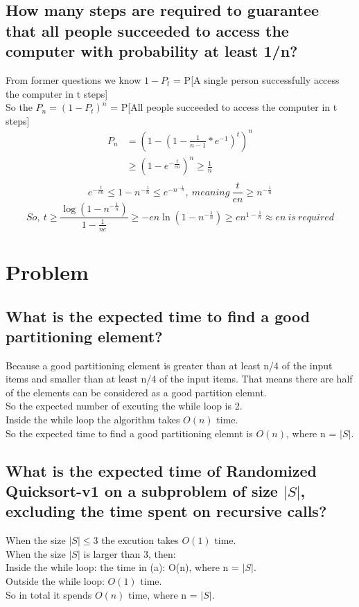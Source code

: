 \documentclass{article}
\begin{document}
\clearpage
\subsection{How many steps are required to guarantee that all people succeeded to access the computer with probability at least 1/n?}
From former questions we know $1-P_t$ = P[A single person successfully access the computer in t steps]\\
So the $P_n = (1-P_t)^n$ = P[All people succeeded to access the computer in t steps]\\
\begin{equation}
\begin{aligned}
P_n &=(1-(1-\frac{1}{n-1}*e^{-1})^t)^{n}\\
&\ge (1-e^{-{\frac{t}{en}}})^{n} \ge \frac{1}{n}\\
\end{aligned}
\end{equation}
$$e^{-{\frac{t}{en}}}\le 1-n^{-\frac{1}{n}}\le e^{-n^{-\frac{1}{n}}},\ meaning\ \frac{t}{en} \ge n^{-\frac{1}{n}}$$
$$So,\ t\ge \frac{\log(1-n^{-\frac{1}{n}})}{1-\frac{1}{ne}} \ge -en\ln(1-n^{-\frac{1}{n}}) \ge en^{1-\frac{1}{n}}\approx en \ is\ required$$

\clearpage
\section{Problem \uppercase\expandafter{}}
\subsection{What is the expected time to find a good partitioning element?}
Because a good partitioning element is greater than at least n/4 of the input items and smaller than at least n/4 of the input items. That means there are half of the elements can be considered as a good partition elemnt.\\
So the expected number of excuting the while loop is 2.\\
Inside the while loop the algorithm takes $O(n)$ time.\\
So the expected time to find a good partitioning elemnt is $O(n)$, where n = $|S|$.
\subsection{What is the expected time of Randomized Quicksort-v1 on a subproblem of size $|S|$, excluding the time spent on recursive calls?}
When the size $|S| \le 3$ the excution takes $O(1)$ time.\\
When the size $|S|$ is larger than 3, then:\\ 
Inside the while loop: the time in (a): O(n), where n = $|S|$.\\
Outside the while loop: $O(1)$ time.\\
So in total it spends $O(n)$ time, where n = $|S|$.
\end{document}
